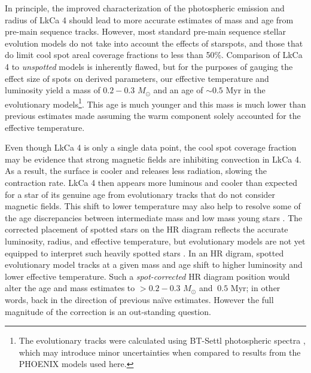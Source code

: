 \documentclass[twocolumn]{emulateapj}%
\begin{document}
In principle, the improved characterization of the photospheric emission and radius of LkCa 4 should lead to more accurate estimates of mass and age from pre-main sequence tracks.  However, most standard pre-main sequence stellar evolution models do not take into account the effects of starspots, and those that do \citep{somers15} limit cool spot areal coverage fractions to less than 50\%.  Comparison of LkCa 4 to \emph{unspotted} models is inherently flawed, but for the purposes of gauging the effect size of spots on derived parameters, our effective temperature and luminosity yield a mass of $0.2-0.3$ $M_\odot$ and an age of $\sim 0.5$ Myr in the \citet{baraffe15} evolutionary models\footnote{The \citet{baraffe15} evolutionary tracks were calculated using BT-Settl photospheric spectra \citep{allard14}, which may introduce minor uncertainties when compared to results from the PHOENIX models used here.}.  This age is much younger and this mass is much lower than previous estimates made assuming the warm component solely accounted for the effective temperature.

Even though LkCa 4 is only a single data point, the cool spot coverage fraction may be evidence that strong magnetic fields are inhibiting convection in LkCa 4.  As a result, the surface is cooler and releases less radiation, slowing the contraction rate.  LkCa 4 then appears more luminous and cooler than expected for a star of its genuine age from evolutionary tracks that do not consider magnetic fields.   This shift to lower temperature may also help to resolve some of the age discrepancies between intermediate mass and low mass young stars \citep[e.g.][]{herczeg15}.  The corrected placement of spotted stars on the HR diagram reflects the accurate luminosity, radius, and effective temperature, but evolutionary models are not yet equipped to interpret such heavily spotted stars \citep{somers15}.  In an HR digram, spotted evolutionary model tracks at a given mass and age shift to higher luminosity and lower effective temperature.  Such a \emph{spot-corrected} HR diagram position would alter the age and mass estimates to $> 0.2-0.3$ $M_\odot$ and $\> 0.5$ Myr; in other words, back in the direction of previous na\"{i}ve estimates.  However the full magnitude of the correction is an out-standing question.

\end{document}
